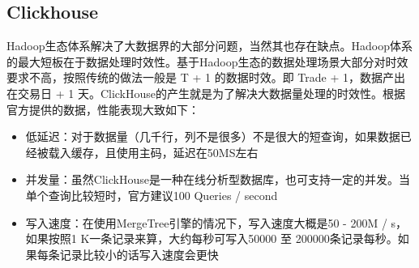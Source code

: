 \documentclass[../../../interview-questions.tex]{subfiles}
\begin{document}
\subsection{Clickhouse}

Hadoop生态体系解决了大数据界的大部分问题，当然其也存在缺点。Hadoop体系的最大短板在于数据处理时效性。基于Hadoop生态的数据处理场景大部分对时效要求不高，按照传统的做法一般是 T + 1 的数据时效。即 Trade + 1，数据产出在交易日 + 1 天。ClickHouse的产生就是为了解决大数据量处理的时效性。根据官方提供的数据，性能表现大致如下：

\begin{itemize}
    \item {低延迟：对于数据量（几千行，列不是很多）不是很大的短查询，如果数据已经被载入缓存，且使用主码，延迟在50MS左右}
    \item {并发量：虽然ClickHouse是一种在线分析型数据库，也可支持一定的并发。当单个查询比较短时，官方建议100 Queries / second}
    \item {写入速度：在使用MergeTree引擎的情况下，写入速度大概是50 - 200M / s，如果按照1 K一条记录来算，大约每秒可写入50000 至 200000条记录每秒。如果每条记录比较小的话写入速度会更快}
\end{itemize}
\end{document}
